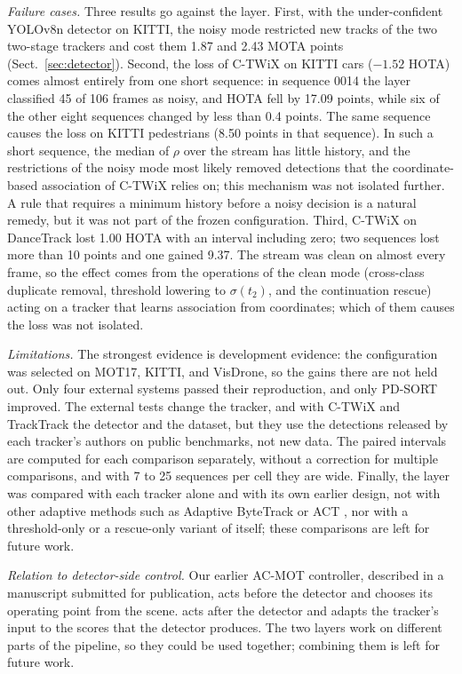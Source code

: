 \emph{Failure cases.} Three results go against the layer. First, with the
under-confident YOLOv8n detector on KITTI, the noisy mode restricted new
tracks of the two two-stage trackers and cost them 1.87 and 2.43 MOTA points
(Sect.~\ref{sec:detector}). Second, the loss of C-TWiX on KITTI cars
($-1.52$ HOTA) comes almost entirely from one short sequence: in sequence 0014
the layer classified 45 of 106 frames as noisy, and HOTA fell by 17.09 points,
while six of the other eight sequences changed by less than 0.4 points. The
same sequence causes the loss on KITTI pedestrians (8.50 points in that
sequence). In such a short sequence, the median of $\rho$ over the stream has
little history, and the restrictions of the noisy mode most likely removed
detections that the coordinate-based association of C-TWiX relies on; this
mechanism was not isolated further. A rule that requires a minimum history
before a noisy decision is a natural remedy, but it was not part of the frozen
configuration. Third, C-TWiX on DanceTrack lost 1.00 HOTA with an interval
including zero; two sequences lost more than 10 points and one gained 9.37.
The stream was clean on almost every frame, so the effect comes from the
operations of the clean mode (cross-class duplicate removal, threshold
lowering to $\sigma(t_2)$, and the continuation rescue) acting on a tracker
that learns association from coordinates; which of them causes the loss was
not isolated.

\emph{Limitations.} The strongest evidence is development evidence: the
configuration was selected on MOT17, KITTI, and VisDrone, so the gains there
are not held out. Only four external systems passed their reproduction, and
only PD-SORT improved. The external tests change the tracker, and with C-TWiX
and TrackTrack the detector and the dataset, but they use the detections
released by each tracker's authors on public benchmarks, not new data. The
paired intervals are computed for each comparison separately, without a
correction for multiple comparisons, and with 7 to 25 sequences per cell they
are wide. Finally, the layer was compared with each tracker alone and with
its own earlier design, not with other adaptive methods such as Adaptive
ByteTrack \cite{ma2023adaptivebytetrack} or ACT \cite{act2026adaptive}, nor
with a threshold-only or a rescue-only variant of itself; these comparisons
are left for future work.

\emph{Relation to detector-side control.} Our earlier AC-MOT controller,
described in a manuscript submitted for publication, acts before the detector
and chooses its operating point from the scene. \scl{} acts after the
detector and adapts the tracker's input to the scores that the detector
produces. The two layers work on different parts of the pipeline, so they
could be used together; combining them is left for future work.

